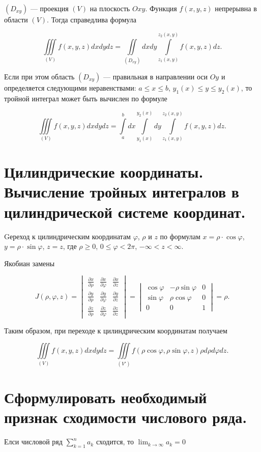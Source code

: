 \documentclass{article}
\begin{document}
$(D_{xy})$ --- проекция $(V)$ на плоскость $Oxy$. Функция $f(x, y, z)$ непрерывна в области $(V)$. Тогда справедлива формула

\[
\iiint\limits_{(V)} f(x, y, z) dxdydz = \iint\limits_{(D_{xy})} dxdy \int\limits_{z_1(x, y)}^{z_2(x, y)} f(x, y, z) dz.
\]

Если при этом область $(D_{xy})$ --- правильная в направлении оси $Oy$ и определяется следующими неравенствами: $a \leq x \leq b$, $y_1(x) \leq y \leq y_2(x)$, то тройной интеграл может быть вычислен по формуле

\[
\iiint\limits_{(V)} f(x, y, z) dxdydz = \int\limits_{a}^{b} dx \int\limits_{y_1(x)}^{y_2(x)} dy \int\limits_{z_1(x, y)}^{z_2(x, y)} f(x, y, z) dz.
\]
\section{Цилиндрические координаты. Вычисление тройных интегралов в цилиндрической системе координат.}
Gереход к цилиндрическим координатам $\varphi$, $\rho$ и $z$ по формулам $x = \rho \cdot \cos\varphi$, $y = \rho \cdot \sin\varphi$, $z = z$, где $\rho \geq 0$, $0 \leq \varphi < 2\pi$, $-\infty<z<\infty$.

Якобиан замены

\[
J(\rho, \varphi, z) =
\begin{vmatrix}
  \frac{\partial x}{\partial \rho} & \frac{\partial x}{\partial \varphi} & \frac{\partial x}{\partial z} \\
  \frac{\partial y}{\partial \rho} & \frac{\partial y}{\partial \varphi} & \frac{\partial y}{\partial z} \\
  \frac{\partial z}{\partial \rho} & \frac{\partial z}{\partial \varphi} & \frac{\partial z}{\partial z}
\end{vmatrix}
=
\begin{vmatrix}
  \cos \varphi & -\rho \sin \varphi & 0 \\
  \sin \varphi & \rho \cos \varphi & 0 \\
  0 & 0 & 1
\end{vmatrix}
= \rho.
\]

Таким образом, при переходе к цилиндрическим координатам получаем

\[
\iiint\limits_{(V)} f(x, y, z) dxdydz = \iiint\limits_{(V')} f(\rho \cos \varphi, \rho \sin \varphi, z) \rho d\rho d\varphi dz.
\]
\section{Сформулировать необходимый признак сходимости числового ряда.}
Елси числовой ряд $\sum_{k=1}^{n}a_k$ сходится, то $\lim_{k \to \infty} a_k = 0$
\end{document}
